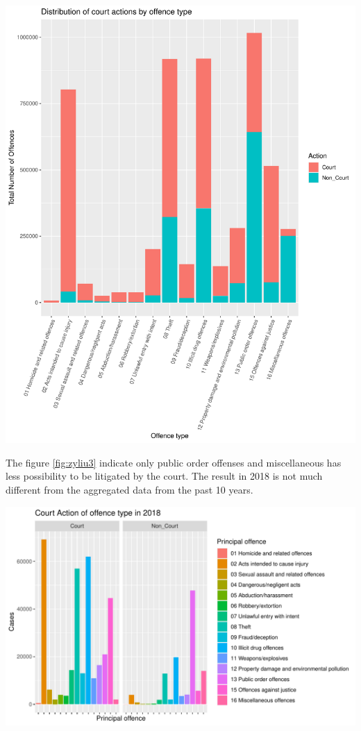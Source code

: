 \documentclass[11pt,a4paper,]{article}
\let\origfigure\figure
\let\endorigfigure\endfigure
\renewenvironment{figure}[1][2] {
\expandafter\origfigure\expandafter[H]
} {
\endorigfigure
}
\begin{document}
\begin{figure}

{\centering \includegraphics{ETC5513-Assignment4_files/figure-latex/zyliu2-1} 

}

\caption{Distribution of court actions by offence type}\label{fig:zyliu2}
\end{figure}

The figure \ref{fig:zyliu3} indicate only public order offenses and miscellaneous has less possibility to be litigated by the court. The result in 2018 is not much different from the aggregated data from the past 10 years.

\begin{figure}

{\centering \includegraphics{ETC5513-Assignment4_files/figure-latex/zyliu3-1} 

}

\caption{Court Action of offence type in 2018}\label{fig:zyliu3}
\end{figure}
\end{document}

